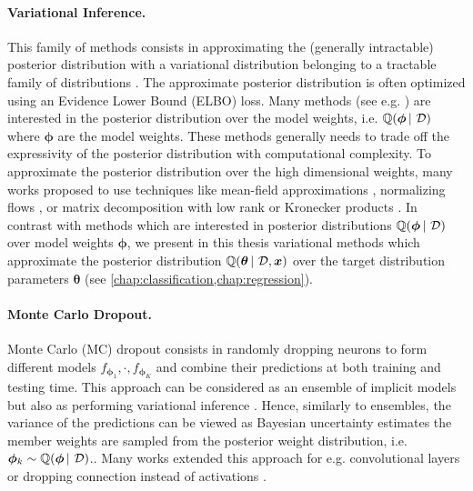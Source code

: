 \paragraph*{Variational Inference.} This family of methods consists in approximating the (generally intractable) posterior distribution with a variational distribution belonging to a tractable family of distributions \cite{blei2017vi}. The approximate posterior distribution is often optimized using an Evidence Lower Bound (ELBO) loss. Many methods (see e.g. \cite{practical-bnn,bayesian-networks,practical_deep_bayesian_principles}) are interested in the posterior distribution over the model weights, i.e. $\operatorname{\mathbb{Q}}(\bm{\phi} \,|\, \operatorname{\mathcal{D}})$ where $\bm{\phi}$ are the model weights. These methods generally needs to trade off the expressivity of the posterior distribution with computational complexity. To approximate the posterior distribution over the high dimensional weights, many works proposed to use techniques like mean-field approximations \citep{practical-bnn,bayesian-networks,practical_deep_bayesian_principles}, normalizing flows \cite{radialflow,Louizos2017}, or matrix decomposition with low rank or Kronecker products \cite{mishkin2018slang,bae2018eigen,zhang2017noisy}. In contrast with methods which are interested in posterior distributions $\operatorname{\mathbb{Q}}(\bm{\phi} \,|\, \operatorname{\mathcal{D}})$ over model weights $\bm{\phi}$, we present in this thesis variational methods which approximate the posterior distribution $\operatorname{\mathbb{Q}}(\bm{\theta} \,|\, \operatorname{\mathcal{D}}, \bm{x})$ over the target distribution parameters $\bm{\theta}$ (see \cref{chap:classification,chap:regression}).

\paragraph*{Monte Carlo Dropout.} Monte Carlo (MC) dropout consists in randomly dropping neurons to form different models $f_{\bm{\phi}_1},\cdot, f_{\bm{\phi}_K}$ and combine their predictions \citep{dropout} at both training and testing time. This approach can be considered as an ensemble of implicit models \citep{abe2022deep} but also as performing variational inference \citep{dropout}. Hence, similarly to ensembles, the variance of the predictions can be viewed as Bayesian uncertainty estimates the member weights are sampled from the posterior weight distribution, i.e. $\bm{\phi}_k \sim \operatorname{\mathbb{Q}}(\bm{\phi} \,|\, \operatorname{\mathcal{D}})$.. Many works extended this approach for e.g. convolutional layers \citep{tassi2020bayesian} or dropping connection instead of activations \citep{wan2013dropconnect}.

